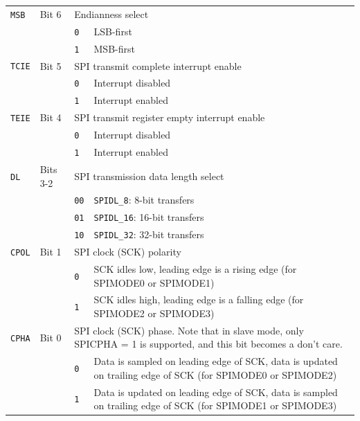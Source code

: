\begin{tabularx}{\textwidth}{ l l l X }
\hline
\texttt{MSB} & Bit 6 & \multicolumn{2}{X}{Endianness select} \\
 & & \texttt{0} & LSB-first \\
 & & \cellcolor{tablehighlightcolor}\texttt{1} & \cellcolor{tablehighlightcolor}MSB-first \\
\hline
\texttt{TCIE} & Bit 5 & \multicolumn{2}{X}{SPI transmit complete interrupt enable} \\
 & & \texttt{0} & Interrupt disabled \\
 & & \cellcolor{tablehighlightcolor}\texttt{1} & \cellcolor{tablehighlightcolor}Interrupt enabled \\
\hline
\texttt{TEIE} & Bit 4 & \multicolumn{2}{X}{SPI transmit register empty interrupt enable} \\
 & & \texttt{0} & Interrupt disabled \\
 & & \cellcolor{tablehighlightcolor}\texttt{1} & \cellcolor{tablehighlightcolor}Interrupt enabled \\
\hline
\texttt{DL} & Bits 3-2 & \multicolumn{2}{X}{SPI transmission data length select} \\
 & & \texttt{00} & \texttt{SPIDL\_8}: 8-bit transfers \\
 & & \cellcolor{tablehighlightcolor}\texttt{01} & \cellcolor{tablehighlightcolor}\texttt{SPIDL\_16}: 16-bit transfers \\
 & & \texttt{10} & \texttt{SPIDL\_32}: 32-bit transfers \\
\hline
\texttt{CPOL} & Bit 1 & \multicolumn{2}{X}{SPI clock (SCK) polarity} \\
 & & \texttt{0} & SCK idles low, leading edge is a rising edge (for SPIMODE0 or SPIMODE1) \\
 & & \cellcolor{tablehighlightcolor}\texttt{1} & \cellcolor{tablehighlightcolor}SCK idles high, leading edge is a falling edge (for SPIMODE2 or SPIMODE3) \\
\hline
\texttt{CPHA} & Bit 0 & \multicolumn{2}{X}{SPI clock (SCK) phase. Note that in slave mode, only SPICPHA = 1 is supported, and this bit becomes a don't care.} \\
 & & \texttt{0} & Data is sampled on leading edge of SCK, data is updated on trailing edge of SCK (for SPIMODE0 or SPIMODE2) \\
 & & \cellcolor{tablehighlightcolor}\texttt{1} & \cellcolor{tablehighlightcolor}Data is updated on leading edge of SCK, data is sampled on trailing edge of SCK (for SPIMODE1 or SPIMODE3) \\
\hline
\end{tabularx}

